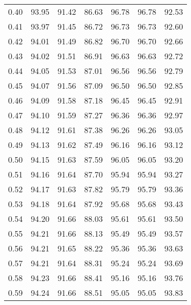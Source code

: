 \begin{tabular}{|c|c|c|c|c|c|c|}
      0.40 &     93.95 &     91.42 &      86.63 &   96.78 &      96.78 &         92.53 \\
      0.41 &     93.97 &     91.45 &      86.72 &   96.73 &      96.73 &         92.60 \\
      0.42 &     94.01 &     91.49 &      86.82 &   96.70 &      96.70 &         92.66 \\
      0.43 &     94.02 &     91.51 &      86.91 &   96.63 &      96.63 &         92.72 \\
      0.44 &     94.05 &     91.53 &      87.01 &   96.56 &      96.56 &         92.79 \\
      0.45 &     94.07 &     91.56 &      87.09 &   96.50 &      96.50 &         92.85 \\
      0.46 &     94.09 &     91.58 &      87.18 &   96.45 &      96.45 &         92.91 \\
      0.47 &     94.10 &     91.59 &      87.27 &   96.36 &      96.36 &         92.97 \\
      0.48 &     94.12 &     91.61 &      87.38 &   96.26 &      96.26 &         93.05 \\
      0.49 &     94.13 &     91.62 &      87.49 &   96.16 &      96.16 &         93.12 \\
      0.50 &     94.15 &     91.63 &      87.59 &   96.05 &      96.05 &         93.20 \\
      0.51 &     94.16 &     91.64 &      87.70 &   95.94 &      95.94 &         93.27 \\
      0.52 &     94.17 &     91.63 &      87.82 &   95.79 &      95.79 &         93.36 \\
      0.53 &     94.18 &     91.64 &      87.92 &   95.68 &      95.68 &         93.43 \\
      0.54 &     94.20 &     91.66 &      88.03 &   95.61 &      95.61 &         93.50 \\
      0.55 &     94.21 &     91.66 &      88.13 &   95.49 &      95.49 &         93.57 \\
      0.56 &     94.21 &     91.65 &      88.22 &   95.36 &      95.36 &         93.63 \\
      0.57 &     94.21 &     91.64 &      88.31 &   95.24 &      95.24 &         93.69 \\
      0.58 &     94.23 &     91.66 &      88.41 &   95.16 &      95.16 &         93.76 \\
      0.59 &     94.24 &     91.66 &      88.51 &   95.05 &      95.05 &         93.83 \\

\end{tabular}
